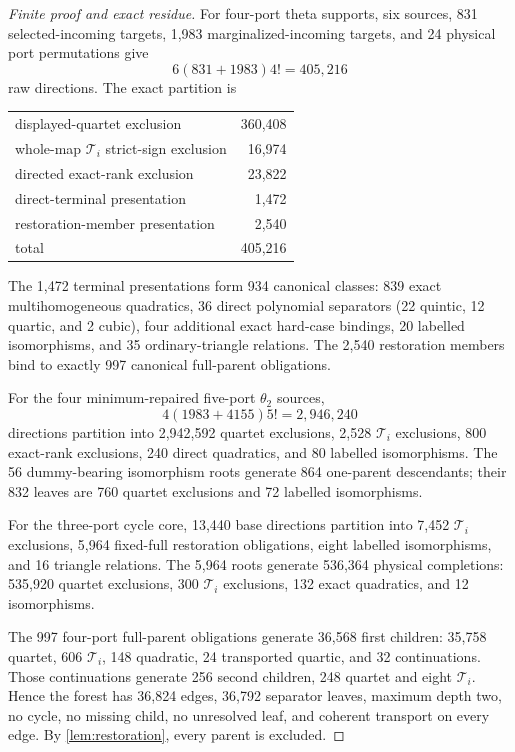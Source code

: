 \documentclass[11pt]{article}
\theoremstyle{remark}
\newcommand{\1}{\mathbf 1}
\begin{document}
\begin{proof}[Finite proof and exact residue]
For four-port theta supports, six sources, 831 selected-incoming targets,
1,983 marginalized-incoming targets, and 24 physical port permutations give
\[
 6(831+1983)4!=405{,}216
\]
raw directions.  The exact partition is
\begin{center}
\begin{tabular}{lr}
displayed-quartet exclusion & 360,408\\
whole-map \(\mathcal T_i\) strict-sign exclusion & 16,974\\
directed exact-rank exclusion & 23,822\\
direct-terminal presentation & 1,472\\
restoration-member presentation & 2,540\\
\midrule
total & 405,216
\end{tabular}
\end{center}
The 1,472 terminal presentations form 934 canonical classes: 839 exact
multihomogeneous quadratics, 36 direct polynomial separators (22 quintic,
12 quartic, and 2 cubic), four additional exact hard-case bindings, 20
labelled isomorphisms, and 35 ordinary-triangle relations.  The 2,540
restoration members bind to exactly 997 canonical full-parent obligations.

For the four minimum-repaired five-port \(\theta_2\) sources,
\[
 4(1983+4155)5!=2{,}946{,}240
\]
directions partition into 2,942,592 quartet exclusions, 2,528
\(\mathcal T_i\) exclusions, 800 exact-rank exclusions, 240 direct
quadratics, and 80 labelled isomorphisms.  The 56 dummy-bearing isomorphism
roots generate 864 one-parent descendants; their 832 leaves are 760 quartet
exclusions and 72 labelled isomorphisms.

For the three-port cycle core, 13,440 base directions partition into 7,452
\(\mathcal T_i\) exclusions, 5,964 fixed-full restoration obligations, eight
labelled isomorphisms, and 16 triangle relations.  The 5,964 roots generate
536,364 physical completions: 535,920 quartet exclusions, 300
\(\mathcal T_i\) exclusions, 132 exact quadratics, and 12 isomorphisms.

The 997 four-port full-parent obligations generate 36,568 first children:
35,758 quartet, 606 \(\mathcal T_i\), 148 quadratic, 24 transported quartic,
and 32 continuations.  Those continuations generate 256 second children,
248 quartet and eight \(\mathcal T_i\).  Hence the forest has 36,824 edges,
36,792 separator leaves, maximum depth two, no cycle, no missing child, no
unresolved leaf, and coherent transport on every edge.  By
\cref{lem:restoration}, every parent is excluded.


\end{proof}
\end{document}
